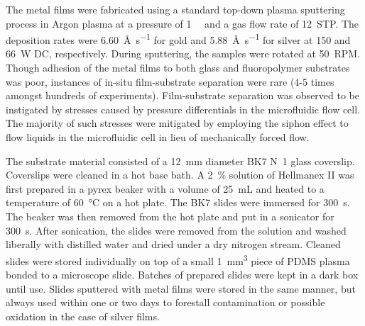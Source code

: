 The metal films were fabricated using a standard top-down plasma sputtering
process in Argon plasma at a pressure of \SI{1}{\milli\torr} and a gas flow
rate of \SI{12}{STP}.  The deposition rates were
\SI{6.60}{\angstrom\per\second} for gold and \SI{5.88}{\angstrom\per\second}
for silver at 150 and \SI{66}{\watt} DC, respectively.  During sputtering, the
samples were rotated at \SI{50}{RPM}.  Though adhesion of the metal films to
both glass and fluoropolymer substrates was poor, instances of in-situ
film-substrate separation were rare (4-5 times amongst hundreds of
experiments).  Film-substrate separation was observed to be instigated by
stresses caused by pressure differentials in the microfluidic flow cell.  The
majority of such stresses were mitigated by employing the siphon effect to flow
liquids in the microfluidic cell in lieu of mechanically forced flow.


The substrate material consisted of a \SI{12}{\milli\meter} diameter BK7
N~1 glass coverslip.  Coverslips were
cleaned in a hot base bath.  A \SI{2}{\percent} solution of Hellmanex II was
first prepared in a pyrex beaker with a volume of \SI{25}{\milli\liter} and
heated to a temperature of \SI{60}{\celsius} on a hot plate.  The BK7 slides
were immersed for \SI{300}{\second}.  The beaker was then removed from the hot
plate and put in a sonicator for \SI{300}{\second}.  After sonication, the
slides were removed from the solution and washed liberally with distilled water
and dried under a dry nitrogen stream.  Cleaned slides were stored individually
on top of a small \SI{1}{\milli\meter\cubed} piece of PDMS plasma bonded to a
microscope slide. Batches of prepared slides were kept in a dark box until use.
Slides sputtered with metal films were stored in the same manner, but always
used within one or two days to forestall contamination or possible oxidation in
the case of silver films.

